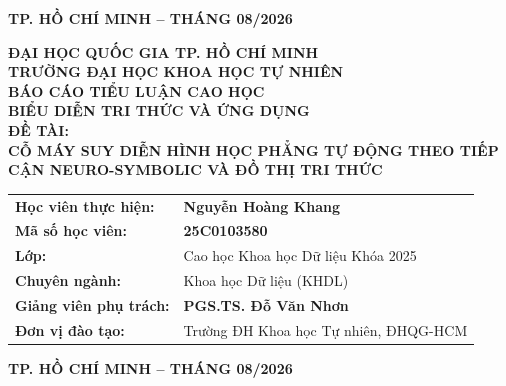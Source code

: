 \begin{titlepage}
\begin{center}
    \vfill
    {\large \textbf{TP. HỒ CHÍ MINH -- THÁNG 08/2026}}
\end{center}

\newpage
\thispagestyle{empty}

\begin{center}
    \vspace*{-0.5cm}
    {\large \textbf{ĐẠI HỌC QUỐC GIA TP. HỒ CHÍ MINH}}\\[0.25cm]
    {\large \textbf{TRƯỜNG ĐẠI HỌC KHOA HỌC TỰ NHIÊN}}\\[1.2cm]

    {\large \textbf{BÁO CÁO TIỂU LUẬN CAO HỌC}}\\[0.25cm]
    {\LARGE \textbf{BIỂU DIỄN TRI THỨC VÀ ỨNG DỤNG}}\\[0.8cm]

    {\Large \textbf{ĐỀ TÀI:}}\\[0.25cm]
    {\huge \bfseries CỖ MÁY SUY DIỄN HÌNH HỌC PHẲNG TỰ ĐỘNG THEO TIẾP CẬN NEURO-SYMBOLIC VÀ ĐỒ THỊ TRI THỨC}\\[1.5cm]

    \begin{center}
    \begin{tabular}{ll}
        \textbf{Học viên thực hiện:} & \textbf{Nguyễn Hoàng Khang} \\
        \textbf{Mã số học viên:}     & \textbf{25C0103580} \\
        \textbf{Lớp:}                & Cao học Khoa học Dữ liệu Khóa 2025 \\
        \textbf{Chuyên ngành:}       & Khoa học Dữ liệu (KHDL) \\
        \textbf{Giảng viên phụ trách:} & \textbf{PGS.TS. Đỗ Văn Nhơn} \\
        \textbf{Đơn vị đào tạo:}     & Trường ĐH Khoa học Tự nhiên, ĐHQG-HCM \\
    \end{tabular}
    \end{center}

    \vfill
    {\large \textbf{TP. HỒ CHÍ MINH -- THÁNG 08/2026}}
\end{center}
\end{titlepage}
